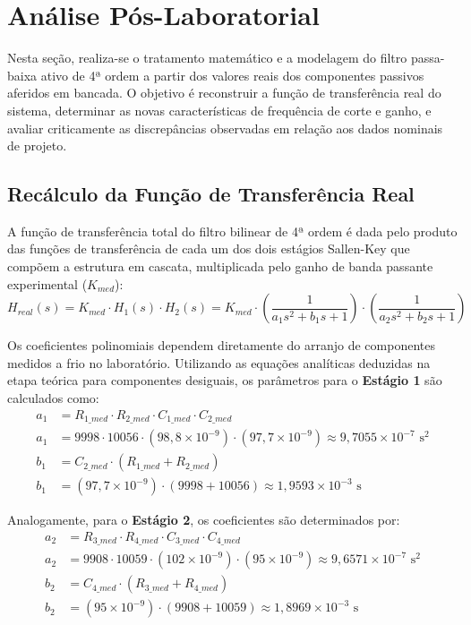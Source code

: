 \chapter{Análise Pós-Laboratorial}

Nesta seção, realiza-se o tratamento matemático e a modelagem do filtro passa-baixa ativo de 4ª ordem a partir dos valores reais dos componentes passivos aferidos em bancada. O objetivo é reconstruir a função de transferência real do sistema, determinar as novas características de frequência de corte e ganho, e avaliar criticamente as discrepâncias observadas em relação aos dados nominais de projeto.

\section{Recálculo da Função de Transferência Real}

A função de transferência total do filtro bilinear de 4ª ordem é dada pelo produto das funções de transferência de cada um dos dois estágios Sallen-Key que compõem a estrutura em cascata, multiplicada pelo ganho de banda passante experimental ($K_{med}$):
\begin{equation}
	H_{real}(s) = K_{med} \cdot H_1(s) \cdot H_2(s) = K_{med} \cdot \left( \frac{1}{a_1 s^2 + b_1 s + 1} \right) \cdot \left( \frac{1}{a_2 s^2 + b_2 s + 1} \right)
\end{equation}

Os coeficientes polinomiais dependem diretamente do arranjo de componentes medidos a frio no laboratório. Utilizando as equações analíticas deduzidas na etapa teórica para componentes desiguais, os parâmetros para o \textbf{Estágio 1} são calculados como:
\begin{align}
	a_1 &= R_{1\_med} \cdot R_{2\_med} \cdot C_{1\_med} \cdot C_{2\_med} \nonumber \\
	a_1 &= 9998 \cdot 10056 \cdot (98,8 \times 10^{-9}) \cdot (97,7 \times 10^{-9}) \approx 9,7055 \times 10^{-7} \text{ s}^2 \\
	b_1 &= C_{2\_med} \cdot (R_{1\_med} + R_{2\_med}) \nonumber \\
	b_1 &= (97,7 \times 10^{-9}) \cdot (9998 + 10056) \approx 1,9593 \times 10^{-3} \text{ s}
\end{align}

Analogamente, para o \textbf{Estágio 2}, os coeficientes são determinados por:
\begin{align}
	a_2 &= R_{3\_med} \cdot R_{4\_med} \cdot C_{3\_med} \cdot C_{4\_med} \nonumber \\
	a_2 &= 9908 \cdot 10059 \cdot (102 \times 10^{-9}) \cdot (95 \times 10^{-9}) \approx 9,6571 \times 10^{-7} \text{ s}^2 \\
	b_2 &= C_{4\_med} \cdot (R_{3\_med} + R_{4\_med}) \nonumber \\
	b_2 &= (95 \times 10^{-9}) \cdot (9908 + 10059) \approx 1,8969 \times 10^{-3} \text{ s}
\end{align}

